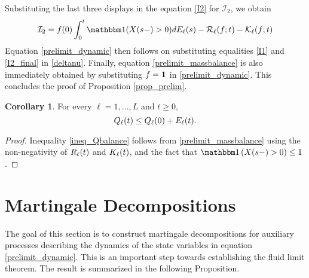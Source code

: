 \documentclass{article}
\theoremstyle{definition}
\newtheorem{corollary}[theorem]{Corollary}
\numberwithin{equation}{section}
\begin{document}
Substituting the last three displays in the equation \eqref{I2} for $\mathcal{I}_2$, we obtain
\begin{equation}\label{I2_final}
\mathcal{I}_2=f(0)\int_0^t\indicil{X(s-)>0} d \arrival_{\ell}(s)-\renegC_\ell(f;t)-\entryC_\ell(f;t)
\end{equation}
Equation \eqref{prelimit_dynamic} then follows on substituting equalities \eqref{I1} and \eqref{I2_final} in \eqref{deltanu}. Finally, equation \eqref{prelimit_massbalance} is also immediately obtained by substituting $f=\f1$ in \eqref{prelimit_dynamic}. This concludes the proof of Proposition \ref{prop_prelim}.


\begin{corollary}
  For every $\ell=1,...,L$ and $t\geq0$,
  \begin{equation}\label{ineq_Qbalance}
    Q_\ell(t) \leq Q_\ell(0)+ E_\ell(t).
  \end{equation}
\end{corollary}
\begin{proof}
  Inequality \eqref{ineq_Qbalance} follows from \eqref{prelimit_massbalance} using the non-negativity of $R_\ell(t)$ and $K_\ell(t)$, and the fact that $\indic{X(s-)>0}\leq1$.
\end{proof}







\section{Martingale Decompositions}\label{sec_mgale}

The goal of this section is to construct martingale decompositions for auxiliary processes describing the dynamics of the state variables in equation \eqref{prelimit_dynamic}. This is an important step towards establishing the fluid limit theorem. The result is summarized in the following Proposition.
\end{document}
